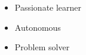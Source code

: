 %
%
%

\twocolumnsection
{
\begin{skills}
\end{skills}}
{
\vspace{1em}
\begin{itemize}
	\item Passionate learner
	\item Autonomous                   
    \item Problem solver
\end{itemize}
}

